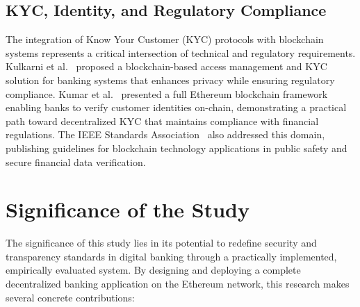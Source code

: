 \documentclass[conference]{IEEEtran}
\begin{document}
\subsection{KYC, Identity, and Regulatory Compliance}

The integration of Know Your Customer (KYC) protocols with blockchain systems
represents a critical intersection of technical and regulatory requirements.
Kulkarni et al.~\cite{ref20} proposed a blockchain-based access management and
KYC solution for banking systems that enhances privacy while ensuring regulatory
compliance. Kumar et al.~\cite{ref21} presented a full Ethereum blockchain
framework enabling banks to verify customer identities on-chain, demonstrating
a practical path toward decentralized KYC that maintains compliance with
financial regulations. The IEEE Standards Association~\cite{ref16} also
addressed this domain, publishing guidelines for blockchain technology
applications in public safety and secure financial data verification.

\section{Significance of the Study}
\label{sec:significance}

The significance of this study lies in its potential to redefine security and
transparency standards in digital banking through a practically implemented,
empirically evaluated system. By designing and deploying a complete
decentralized banking application on the Ethereum network, this research makes
several concrete contributions:
\end{document}
